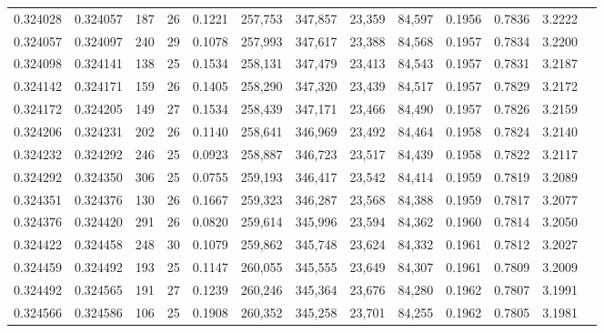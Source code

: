 \begin{tabular}{rrrrrrrrrrrrr}
0.324028 & 0.324057 &   187 &  26 &                                     0.1221 & 257,753 & 347,857 &  23,359 &  84,597 & 0.1956 & 0.7836 & 3.2222 \\
0.324057 & 0.324097 &   240 &  29 &                                     0.1078 & 257,993 & 347,617 &  23,388 &  84,568 & 0.1957 & 0.7834 & 3.2200 \\
0.324098 & 0.324141 &   138 &  25 &                                     0.1534 & 258,131 & 347,479 &  23,413 &  84,543 & 0.1957 & 0.7831 & 3.2187 \\
0.324142 & 0.324171 &   159 &  26 &                                     0.1405 & 258,290 & 347,320 &  23,439 &  84,517 & 0.1957 & 0.7829 & 3.2172 \\
0.324172 & 0.324205 &   149 &  27 &                                     0.1534 & 258,439 & 347,171 &  23,466 &  84,490 & 0.1957 & 0.7826 & 3.2159 \\
0.324206 & 0.324231 &   202 &  26 &                                     0.1140 & 258,641 & 346,969 &  23,492 &  84,464 & 0.1958 & 0.7824 & 3.2140 \\
0.324232 & 0.324292 &   246 &  25 &                                     0.0923 & 258,887 & 346,723 &  23,517 &  84,439 & 0.1958 & 0.7822 & 3.2117 \\
0.324292 & 0.324350 &   306 &  25 &                                     0.0755 & 259,193 & 346,417 &  23,542 &  84,414 & 0.1959 & 0.7819 & 3.2089 \\
0.324351 & 0.324376 &   130 &  26 &                                     0.1667 & 259,323 & 346,287 &  23,568 &  84,388 & 0.1959 & 0.7817 & 3.2077 \\
0.324376 & 0.324420 &   291 &  26 &                                     0.0820 & 259,614 & 345,996 &  23,594 &  84,362 & 0.1960 & 0.7814 & 3.2050 \\
0.324422 & 0.324458 &   248 &  30 &                                     0.1079 & 259,862 & 345,748 &  23,624 &  84,332 & 0.1961 & 0.7812 & 3.2027 \\
0.324459 & 0.324492 &   193 &  25 &                                     0.1147 & 260,055 & 345,555 &  23,649 &  84,307 & 0.1961 & 0.7809 & 3.2009 \\
0.324492 & 0.324565 &   191 &  27 &                                     0.1239 & 260,246 & 345,364 &  23,676 &  84,280 & 0.1962 & 0.7807 & 3.1991 \\
0.324566 & 0.324586 &   106 &  25 &                                     0.1908 & 260,352 & 345,258 &  23,701 &  84,255 & 0.1962 & 0.7805 & 3.1981 \\

\end{tabular}
